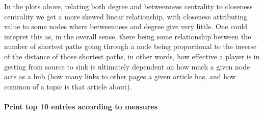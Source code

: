 \documentclass[11pt]{article}
\begin{document}
    In the plots above, relating both degree and betweenness centrality to
closeness centrality we get a more skewed linear relationship, with
closeness attributing value to some nodes where betweenness and degree
give very little. One could intepret this as, in the overall sense,
there being some relationship between the number of shortest paths going
through a node being proportional to the inverse of the distance of
those shortest paths, in other words, how effective a player is in
getting from source to sink is ultimately dependent on how much a given
node acts as a hub (how many links to other pages a given article has,
and how common of a topic is that article about).

    \paragraph{Print top 10 entries according to
measures}\label{print-top-10-entries-according-to-measures}
\end{document}
